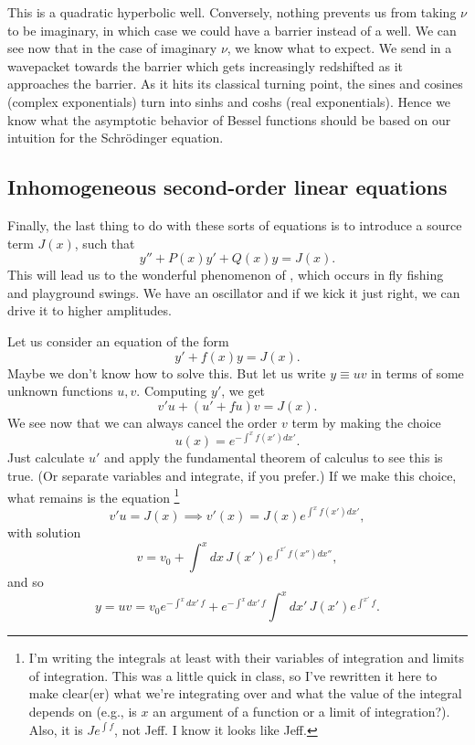 This is a quadratic hyperbolic well. Conversely, nothing prevents us from taking $\nu$ to be imaginary, in which case we could have a barrier instead of a well.
We can see now that in the case of imaginary $\nu$, we know what to expect. We send in a wavepacket towards the barrier which gets increasingly redshifted as it approaches the barrier. As it hits its classical turning point, the sines and cosines (complex exponentials) turn into sinhs and coshs (real exponentials). Hence we know what the asymptotic behavior of Bessel functions should be based on our intuition for the Schr\"odinger equation.

\subsection*{Inhomogeneous second-order linear equations}
Finally, the last thing to do with these sorts of equations is to introduce a source term $J(x)$, such that
\begin{equation}
    y'' + P(x) y' + Q(x)y = J(x).
\end{equation}
This will lead us to the wonderful phenomenon of , which occurs in fly fishing and playground swings. We have an oscillator and if we kick it just right, we can drive it to higher amplitudes.

Let us consider an equation of the form
\begin{equation}
    y'+f(x) y = J(x).
\end{equation}
Maybe we don't know how to solve this. But let us write $y\equiv uv$ in terms of some unknown functions $u,v$. Computing $y'$, we get
\begin{equation}
    v' u + (u'  +f u)v = J(x).
\end{equation}
We see now that we can always cancel the order $v$ term by making the choice
\begin{equation}
    u(x)=e^{-\int^x f(x')dx'}.
\end{equation}
Just calculate $u'$ and apply the fundamental theorem of calculus to see this is true. (Or separate variables and integrate, if you prefer.) If we make this choice, what remains is the equation%
    \footnote{I'm writing the integrals at least with their variables of integration and limits of integration. This was a little quick in class, so I've rewritten it here to make clear(er) what we're integrating over and what the value of the integral depends on (e.g., is $x$ an argument of a function or a limit of integration?). Also, it is $J e^{\int f}$, not Jeff. I know it looks like Jeff.}
\begin{equation}
    v' u = J(x) \implies v'(x) = J(x) e^{\int^x f(x') dx'},
\end{equation}
with solution
\begin{equation}
    v= v_0 + \int^x dx \, J(x') e^{\int^{x'} f(x'')dx''},
\end{equation}
and so
\begin{equation}
    y= uv= v_0 e^{-\int^x dx'\,f} + e^{-\int^x dx'\,f} \int^x dx'\,J(x') e^{\int^{x'} f}.
\end{equation}

